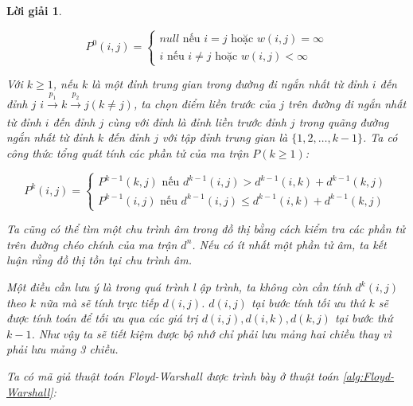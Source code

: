 \documentclass[14pt, a4paper]{article}
\theoremstyle{sltheorem}
\theoremstyle{soltheorem}
\newtheorem*{loigiai}{Lời giải}
\begin{document}
\begin{loigiai}
\begin{itemize}
\begin{itemize}
                \begin{equation*}
                    P^{0}(i, j) = \begin{cases} null \text{ nếu } i = j \text{ hoặc } w(i, j) = \infty \\ i \text{ nếu } i \neq j \text{ hoặc } w(i, j) < \infty \end{cases}
                \end{equation*}

                Với $k \geq 1$, nếu $k$ là một đỉnh trung gian trong đường đi ngắn nhất từ đỉnh $i$ đến đỉnh $j$ $i \xrightarrow[]{p_1} k \xrightarrow[]{p_2} j (k \neq j)$,
                ta chọn điểm liền trước của $j$ trên đường đi ngắn nhất từ đỉnh $i$ đến đỉnh $j$ cùng với đỉnh là đỉnh liền trước đỉnh $j$ trong quãng đường ngắn nhất từ đỉnh $k$ đến đỉnh $j$ với tập đỉnh trung gian là $\lbrace 1, 2, \dots, k - 1 \rbrace$.
                Ta có công thức tổng quát tính các phần tử của ma trận $P (k \geq 1)$:

                \begin{equation*}
                    P^{k}(i, j) = \begin{cases} P^{k-1}(k, j) \text{ nếu } d^{k-1}(i, j) > d^{k-1}(i, k) + d^{k-1}(k, j) \\
                                                P^{k-1}(i, j) \text{ nếu } d^{k-1}(i, j) \leq d^{k-1}(i, k) + d^{k-1}(k, j) \end{cases}
                \end{equation*}

                Ta cũng có thể tìm một chu trình âm trong đồ thị bằng cách kiểm tra các phần tử trên đường chéo chính của ma trận $d^{n}$.
                Nếu có ít nhất một phần tử âm, ta kết luận rằng đồ thị tồn tại chu trình âm.
                
                Một điều cần lưu ý là trong quá trình l ập trình, ta không còn cần tính $d^{k}(i, j)$ theo $k$ nữa mà sẽ tính trực tiếp $d(i, j)$.
                $d(i, j)$ tại bước tính tối ưu thứ $k$ sẽ được tính toán để tối ưu qua các giá trị $d(i, j), d(i, k), d(k, j)$ tại bước thứ $k-1$.
                Như vậy ta sẽ tiết kiệm được bộ nhớ chỉ phải lưu mảng hai chiều thay vì phải lưu mảng 3 chiều.

                Ta có mã giả thuật toán Floyd-Warshall được trình bày ở thuật toán \ref{alg:Floyd-Warshall}:

                \begin{algorithm}[h!]
                    \DontPrintSemicolon


\end{algorithm}
\end{itemize}
\end{itemize}
\end{loigiai}
\end{document}
